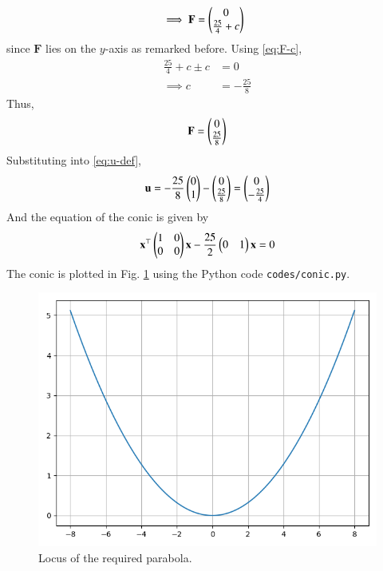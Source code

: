 \documentclass[journal,12pt,twocolumn]{IEEEtran}
\renewcommand{\vec}[1]{\boldsymbol{\mathbf{#1}}}
\begin{document}
\begin{enumerate}
\begin{align}
        &\implies \vec{F} = \myvec{0\\\frac{25}{4}+c} \label{eq:F-coords}
    \end{align}
    since $\vec{F}$ lies on the $y$-axis as remarked before. Using 
    \eqref{eq:F-c},
    \begin{align}
        \frac{25}{4}+c\pm c &= 0 \\
        \implies c &= -\frac{25}{8}
    \end{align}
    Thus,
    \begin{align}
        \vec{F} = \myvec{0\\\frac{25}{8}}
    \end{align}
    Substituting into \eqref{eq:u-def},
    \begin{align}
        \vec{u} = -\frac{25}{8}\myvec{0\\1} - \myvec{0\\\frac{25}{8}} = \myvec{0\\-\frac{25}{4}}
    \end{align}
    And the equation of the conic is given by
    \begin{align}
        \vec{x}^\top\myvec{1&0\\0&0}\vec{x} - \frac{25}{2}\myvec{0&1}\vec{x} = 0
    \end{align}
    The conic is plotted in Fig. \ref{fig:conic} using the Python code 
    \texttt{codes/conic.py}.
    \begin{figure}[!ht]
        \centering
        \includegraphics[width=\columnwidth]{figs/conic.png}
        \caption{Locus of the required parabola.}
        \label{fig:conic}
    \end{figure}
\end{enumerate}
\end{document}
